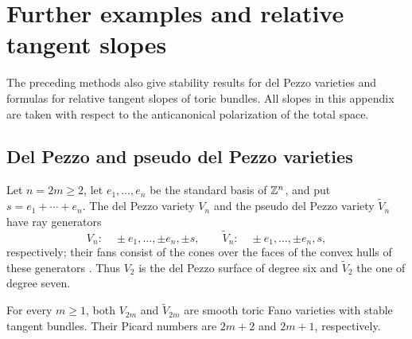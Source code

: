 \section{Further examples and relative tangent slopes}\label{sec:auxiliary}

The preceding methods also give stability results for del Pezzo varieties
and formulas for relative tangent slopes of toric bundles. All slopes
in this appendix are taken with respect to the anticanonical
polarization of the total space.

\subsection{Del Pezzo and pseudo del Pezzo varieties}

Let $n=2m\ge2$, let $e_1,\ldots,e_n$ be the standard basis of
$\mathbb{Z}^n$, and put $s=e_1+\cdots+e_n$. The del Pezzo variety $V_n$ and
the pseudo del Pezzo variety $\widetilde V_n$ have ray generators
\[
 V_n:\quad \pm e_1,\ldots,\pm e_n,\pm s,
 \qquad
 \widetilde V_n:\quad \pm e_1,\ldots,\pm e_n,s,
\]
respectively; their fans consist of the cones over the faces of the
convex hulls of these generators
\cite{VoskresenskiiKlyachko1985,Ewald1988,Nill2006}.
Thus $V_2$ is the del Pezzo surface of degree six and
$\widetilde V_2$ the one of degree seven.

\begin{proposition}\label{aux:delpezzo}
For every $m\ge1$, both $V_{2m}$ and $\widetilde V_{2m}$ are smooth
toric Fano varieties with stable tangent bundles. Their Picard numbers
are $2m+2$ and $2m+1$, respectively.
\end{proposition}

